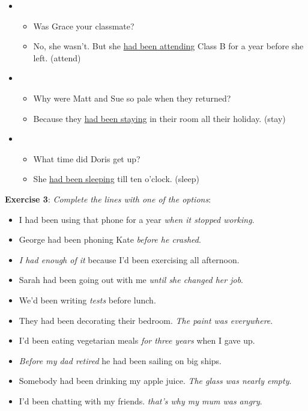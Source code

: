 \begin{itemize}
\item
\begin{itemize}
\item Was Grace your classmate?
\item No, she wasn't. But she \underline{had been attending} Class B for a year before she left. (attend)
\end{itemize}

\item
\begin{itemize}
\item Why were Matt and Sue so pale when they returned?
\item Because they \underline{had been staying} in their room all their holiday. (stay)
\end{itemize}

\item
\begin{itemize}
\item What time did Doris get up?
\item She \underline{had been sleeping} till ten o'clock. (sleep)
\end{itemize}

\end{itemize}

\textbf{Exercise 3}: \textit{Complete the lines with one of the options}:

\begin{itemize}

\item I had been using that phone for a year \textit{when it stopped working}.
\item George had been phoning Kate \textit{before he crashed}.
\item \textit{I had enough of it} because I'd been exercising all afternoon.
\item Sarah had been going out with me \textit{until she changed her job}.
\item We'd been writing \textit{tests} before lunch.
\item They had been decorating their bedroom. \textit{The paint was everywhere}.
\item I'd been eating vegetarian meals \textit{for three years} when I gave up.
\item \textit{Before my dad retired} he had been sailing on big ships.
\item Somebody had been drinking my apple juice. \textit{The glass was nearly empty}.
\item I'd been chatting with my friends. \textit{that's why my mum was angry}.

\end{itemize}

